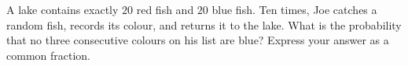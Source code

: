 A lake contains exactly $20$ red fish and $20$ blue fish. Ten times, Joe catches a random fish, records its colour, and returns it to the lake. What is the probability that no three consecutive colours on his list are blue? Express your answer as a common fraction.

